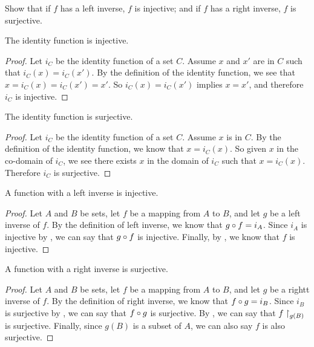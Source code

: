 \documentclass[main.tex]{subfiles}
\begin{document}
\subproblem{}\label{s2p5a}

Show that if \(f\) has a left inverse, \(f\) is injective; and if \(f\) has a
right inverse, \(f\) is surjective.

\begin{thm}
	The identity function is injective.
\end{thm}
\begin{proof}
	Let \(i_C\) be the identity function of a set \(C\). Assume \(x\) and
	\(x'\) are in \(C\) such that \(i_C(x) = i_C(x')\). By the definition of
	the identity function, we see that \(x = i_C(x) = i_C(x') = x'\). So
	\(i_C(x) = i_C(x')\) implies \(x = x'\), and therefore \(i_C\) is
	injective.
\end{proof}

\begin{thm}
	The identity function is surjective.
\end{thm}
\begin{proof}
	Let \(i_C\) be the identity function of a set \(C\). Assume \(x\) is in
	\(C\). By the definition of the identity function, we know that
	\(x = i_C(x)\). So given \(x\) in the co-domain of \(i_C\), we see there
	exists \(x\) in the domain of \(i_C\) such that \(x = i_C(x)\).
	Therefore \(i_C\) is surjective.
\end{proof}

\begin{thm}
	A function with a left inverse is injective.
\end{thm}
\begin{proof}
	Let \(A\) and \(B\) be sets, let \(f\) be a mapping from \(A\) to \(B\),
	and let \(g\) be a left inverse of \(f\). By the definition of left
	inverse, we know that \({g} \circ{} {f} = i_A\). Since \(i_A\) is
	injective by , we can say that \({g} \circ{} {f}\) is
	injective.  Finally, by , we know that \(f\) is
	injective.
\end{proof}

\begin{thm}
	A function with a right inverse is surjective.
\end{thm}
\begin{proof}
	Let \(A\) and \(B\) be sets, let \(f\) be a mapping from \(A\) to \(B\),
	and let \(g\) be a rightt inverse of \(f\). By the definition of right
	inverse, we know that \({f} \circ{} {g} = i_B\). Since \(i_B\) is
	surjective by , we can say that \({f} \circ{} {g}\) is
	surjective. By , we can say that \({f}\restriction_{g(B)}\)
	is surjective. Finally, since \(g(B)\) is a subset of \(A\), we can also
	say \(f\) is also surjective.
\end{proof}
\end{document}
